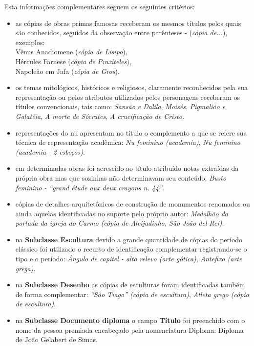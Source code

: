 Esta informações complementares seguem os seguintes critérios:
\begin{itemize}
	\item as cópias de obras primas famosas receberam os mesmos títulos pelos quais são conhecidos, seguidos da observação entre parênteses - (\textit{cópia de...}), exemplos:\\ 
	Vênus Anadiomene (\textit{cópia de Lisipo}), \\
	Hércules Farnese (\textit{cópia de Praxíteles}), \\
	Napoleão em Jafa (\textit{cópia de Gros}).
	\item os temas mitológicos, históricos e religiosos, claramente reconhecidos pela sua representação ou pelos atributos utilizados pelos personagens receberam os títulos convencionais, tais como: \textit{Sansão e Dalila}, \textit{Moisés}, \textit{Pigmalião e Galatéia}, \textit{A morte de Sócrates}, \textit{A crucificação de Cristo}.
	\item representações do nu apresentam no título o complemento a que se refere sua técnica de representação acadêmica: \textit{Nu feminino (academia)}, \textit{Nu feminino (academia - 2 esboços)}.
	\item em determinadas obras foi acrescido ao título atribuído notas extraídas da própria obra mas que sozinhas não determinavam seu conteúdo: \textit{Busto feminino - ``grand étude aux deux crayons n. 44''}.
	\item cópias de detalhes arquitetônicos de construção de monumentos renomados ou ainda aquelas identificadas no suporte pelo próprio autor: \textit{Medalhão da portada da igreja do Carmo (cópia de Aleijadinho, São João del Rei)}.
	\item na \textbf{Subclasse Escultura} devido a grande quantidade de cópias do período clássico foi utilizado o recurso de identificação complementar registrando-se o tipo e o período: \textit{Ângulo de capitel - alto relevo (arte gótica)}, \textit{Antefixo (arte grega)}.
	\item na \textbf{Subclasse Desenho} as cópias de esculturas foram identificadas também de forma complementar: \textit{``São Tiago'' (cópia de escultura)}, \textit{Atleta grego (cópia de escultura)}.
	\item na \textbf{Subclasse Documento diploma} o campo \textbf{Título} foi preenchido com o nome da pessoa premiada encabeçado pela nomenclatura Diploma: Diploma de João Gelabert de Simas.
\end{itemize}


